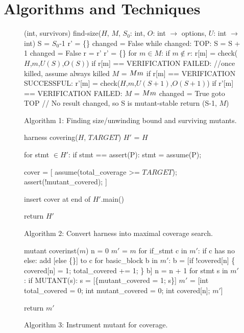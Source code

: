 \documentclass[conference]{IEEEtran}
\begin{document}
\section{Algorithms and Techniques}

\begin{figure}
{\scriptsize 
\begin{code}
(int, survivors) find-size($H$, $M$, $S_0$: int,
                           $O$: int $\rightarrow$ options,
                           $U$: int $\rightarrow$ int) 
\vspace{0.1in}
S = $S_0$-1 
r' = \{\}
changed = False 
while changed:
   TOP:
   S = S + 1 
   changed = False 
   r = r' 
   r' = \{\}
   for $m \in M$:
      if $m \not\in r$:
         r[m] = check($H$,$m$,$U(S)$,$O(S)$) 
         if r[m] == VERIFICATION FAILED:
            //once killed, assume always killed 
            $M$ = $M \\ m$
      if r[m] == VERIFICATION SUCCESSFUL:
         r'[m] = check($H$,$m$,$U(S+1)$,$O(S+1)$) 
         if r'[m] == VERIFICATION FAILED:
            $M$ = $M \\ m$
            changed = True 
            goto TOP 
// No result changed, so S is mutant-stable 
return (S-1, $M$) 
\end{code}
}
\caption{Algorithm 1: Finding size/unwinding bound and surviving mutants.}
\label{alg:unwind}
\end{figure}

\begin{figure}
{\scriptsize 
\begin{code}
harness covering($H$, $TARGET$) 
\vspace{0.1in}
$H'$ = $H$

for stmt $\in H'$:
   if stmt == assert(P):
      stmt = assume(P);

cover = [
  assume(total\_coverage >= $TARGET$); 
  assert(!mutant\_covered);
]

insert cover at end of $H'$.main() 

return $H'$
\end{code}
}
\caption{Algorithm 2: Convert harness into maximal coverage search.}
\label{alg:invert}
\end{figure}

\begin{figure}
{\scriptsize 
\begin{code}
mutant coverinst($m$) 
\vspace{0.1in}
n = 0
$m'$ = $m$
for if\_stmt c in $m'$:
   if c has no else:
      add [else \{\}] to c
for basic\_block b in $m'$:
   b = [if !covered[n] \{
           covered[n] = 1;
           total\_covered += 1;
        \}
        b]
   n = n + 1
for stmt s in $m'$:
   if MUTANT(s):
      s = [\{mutant\_covered = 1;
            s\}]
$m'$ = [int total\_covered = 0;
      int mutant\_covered = 0;
      int covered[n];
      $m'$]

return $m'$
\end{code}
}
\caption{Algorithm 3: Instrument mutant for coverage.}
\label{alg:covermut}
\end{figure}
\end{document}
